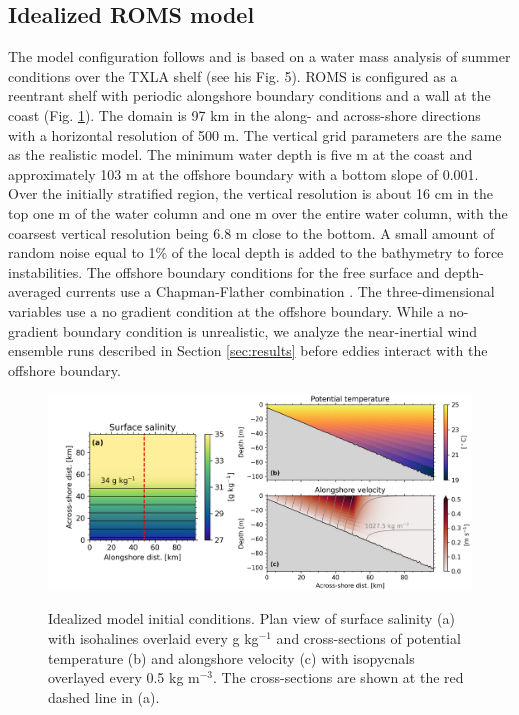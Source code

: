 \subsection{Idealized ROMS model}
The model configuration follows \citet{Hetland_2017} and is based on a water mass analysis of summer conditions over the TXLA shelf (see his Fig. 5). ROMS is configured as a reentrant shelf with periodic alongshore boundary conditions and a wall at the coast (Fig. \ref{fig:ideal_ics}). The domain is 97 km in the along- and across-shore directions with a horizontal resolution of 500 m. The vertical grid parameters are the same as the realistic model. The minimum water depth is five m at the coast and approximately 103 m at the offshore boundary with a bottom slope of 0.001. Over the initially stratified region, the vertical resolution is about 16 cm in the top one m of the water column and one m over the entire water column, with the coarsest vertical resolution being 6.8 m close to the bottom. A small amount of random noise equal to 1\% of the local depth is added to the bathymetry to force instabilities. The offshore boundary conditions for the free surface and depth-averaged currents use a Chapman-Flather combination \citep{chapman1985numerical,flather1976tidal}. The three-dimensional variables use a no gradient condition at the offshore boundary. While a no-gradient boundary condition is unrealistic, we analyze the near-inertial wind ensemble runs described in Section \ref{sec:results} before eddies interact with the offshore boundary. 

\begin{figure}[t]
    \begin{center}
    \includegraphics[width = \linewidth]{figures/shelfstrat_2024/initial_conditions_1.jpg} \\
    \caption{Idealized model initial conditions. Plan view of surface salinity (a) with isohalines overlaid every g kg$^{-1}$ and cross-sections of potential temperature (b) and alongshore velocity (c) with isopycnals overlayed every 0.5 kg m$^{-3}$. The cross-sections are shown at the red dashed line in (a).} \label{fig:ideal_ics}
     \end{center}
\end{figure}

